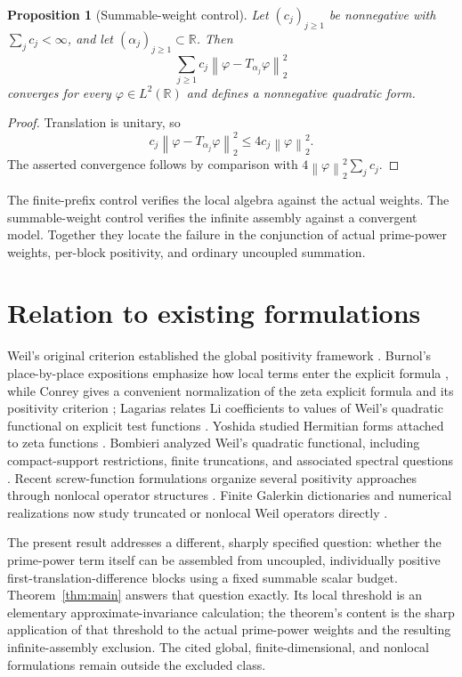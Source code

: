 \documentclass[11pt,a4paper]{amsart}
\newcommand{\R}{\mathbb{R}}
\newcommand{\norm}[1]{\left\lVert #1\right\rVert_{2}}
\theoremstyle{plain}
\newtheorem{proposition}[theorem]{Proposition}
\theoremstyle{definition}
\begin{document}
\begin{proposition}[Summable-weight control]\label{prop:summable-control}
Let $(c_j)_{j\geq1}$ be nonnegative with $\sum_jc_j<\infty$, and let
$(\alpha_j)_{j\geq1}\subset\R$.  Then
\[
 \sum_{j\geq1}c_j\norm{\varphi-T_{\alpha_j}\varphi}^{2}
\]
converges for every $\varphi\in L^2(\R)$ and defines a nonnegative quadratic
form.
\end{proposition}

\begin{proof}
Translation is unitary, so
\[
 c_j\norm{\varphi-T_{\alpha_j}\varphi}^{2}
 \leq4c_j\norm{\varphi}^{2}.
\]
The asserted convergence follows by comparison with $4\norm{\varphi}^2
\sum_jc_j$.
\end{proof}

The finite-prefix control verifies the local algebra against the actual
weights.  The summable-weight control verifies the infinite assembly against a
convergent model.  Together they locate the failure in the conjunction of
actual prime-power weights, per-block positivity, and ordinary uncoupled
summation.

\section{Relation to existing formulations}

Weil's original criterion established the global positivity framework
\cite{Weil1952}.  Burnol's place-by-place expositions emphasize how local
terms enter the explicit formula \cite{Burnol1998,Burnol2000}, while Conrey gives a
convenient normalization of the zeta explicit formula and its positivity
criterion \cite{Conrey2003}; Lagarias relates Li coefficients to values of
Weil's quadratic functional on explicit test functions \cite{Lagarias2007}.
Yoshida studied Hermitian forms attached to zeta
functions \cite{Yoshida1992}.  Bombieri analyzed Weil's quadratic functional,
including compact-support restrictions, finite truncations, and associated
spectral questions \cite{Bombieri2000}.  Recent screw-function formulations
organize several positivity approaches through nonlocal operator structures
\cite{Suzuki2026}.  Finite Galerkin dictionaries and numerical realizations
now study truncated or nonlocal Weil operators directly
\cite{Groskin2026,KimEtAl2026}.

The present result addresses a different, sharply specified question: whether
the prime-power term itself can be assembled from uncoupled, individually
positive first-translation-difference blocks using a fixed summable scalar
budget.  Theorem~\ref{thm:main} answers that question exactly.  Its local
threshold is an elementary approximate-invariance calculation; the theorem's
content is the sharp application of that threshold to the actual prime-power
weights and the resulting infinite-assembly exclusion.  The cited
global, finite-dimensional, and nonlocal formulations remain outside the
excluded class.
\end{document}
